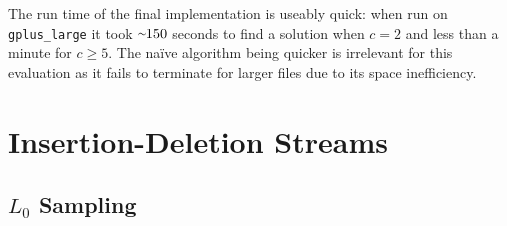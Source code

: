 \documentclass[11pt,twoside,a4paper]{report}
\begin{document}
\par The run time of the final implementation is useably quick: when run on \texttt{gplus\_large} it took $\smallsim\!\!150$ seconds to find a solution when $c=2$ and less than a minute for $c\geq5$. The naïve algorithm being quicker is irrelevant for this evaluation as it fails to terminate for larger files due to its space inefficiency.

\chapter{Insertion-Deletion Streams}

\section{$L_0$ Sampling}

\end{document}
